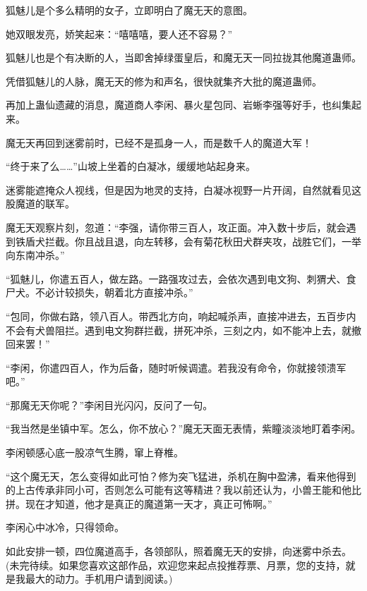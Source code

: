 \begin{this_body}
狐魅儿是个多么精明的女子，立即明白了魔无天的意图。

她双眼发亮，娇笑起来：“嘻嘻嘻，要人还不容易？”

狐魅儿也是个有决断的人，当即舍掉绿蛋皇后，和魔无天一同拉拢其他魔道蛊师。

凭借狐魅儿的人脉，魔无天的修为和声名，很快就集齐大批的魔道蛊师。

再加上蛊仙遗藏的消息，魔道商人李闲、暴火星包同、岩蜥李强等好手，也纠集起来。

魔无天再回到迷雾前时，已经不是孤身一人，而是数千人的魔道大军！

“终于来了么……”山坡上坐着的白凝冰，缓缓地站起身来。

迷雾能遮掩众人视线，但是因为地灵的支持，白凝冰视野一片开阔，自然就看见这股魔道的联军。

魔无天观察片刻，忽道：“李强，请你带三百人，攻正面。冲入数十步后，就会遇到铁盾犬拦截。你且战且退，向左转移，会有菊花秋田犬群夹攻，战胜它们，一举向东南冲杀。”

“狐魅儿，你遣五百人，做左路。一路强攻过去，会依次遇到电文狗、刺猬犬、食尸犬。不必计较损失，朝着北方直接冲杀。”

“包同，你做右路，领八百人。带西北方向，响起喊杀声，直接冲进去，五百步内不会有犬兽阻拦。遇到电文狗群拦截，拼死冲杀，三刻之内，如不能冲上去，就撤回来罢！”

“李闲，你遣四百人，作为后备，随时听候调遣。若我没有命令，你就接领溃军吧。”

“那魔无天你呢？”李闲目光闪闪，反问了一句。

“我当然是坐镇中军。怎么，你不放心？”魔无天面无表情，紫瞳淡淡地盯着李闲。

李闲顿感心底一股凉气生腾，窜上脊椎。

“这个魔无天，怎么变得如此可怕？修为突飞猛进，杀机在胸中盈沸，看来他得到的上古传承非同小可，否则怎么可能有这等精进？我以前还认为，小兽王能和他比拼。现在才知道，他才是真正的魔道第一天才，真正可怖啊。”

李闲心中冰冷，只得领命。

如此安排一顿，四位魔道高手，各领部队，照着魔无天的安排，向迷雾中杀去。(未完待续。如果您喜欢这部作品，欢迎您来起点投推荐票、月票，您的支持，就是我最大的动力。手机用户请到阅读。)

\end{this_body}

